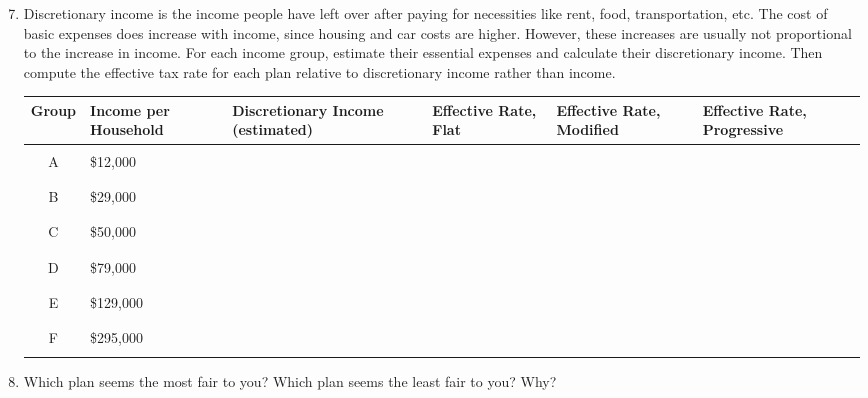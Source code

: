 \begin{exercises}
\begin{minipage}[t]{\textwidth}
\begin{enumerate}[1)]
\setcounter{enumi}{6}
\item Discretionary income is the income people have left over after paying for necessities like rent, food, transportation, etc.  The cost of basic expenses does increase with income, since housing and car costs are higher.  However, these increases are usually not proportional to the increase in income.  For each income group, estimate their essential expenses and calculate their discretionary income.  Then compute the effective tax rate for each plan relative to discretionary income rather than income.
\begin{center}
\begin{tabular}{|c | p{0.75in} | p{1.3in} | p{0.75in} | p{1in} | p{1in} |}
\hline
Group & Income per Household & Discretionary Income (estimated) & Effective Rate, Flat & Effective Rate, Modified & Effective Rate, Progressive\\
\hline
& & & & & \\
A & \$12,000 & & & & \\
& & & & & \\
\hline
& & & & & \\
B & \$29,000 & & & & \\
& & & & & \\
\hline
& & & & & \\
C & \$50,000 & & & & \\
& & & & & \\
\hline
& & & & & \\
D & \$79,000 & & & & \\
& & & & & \\
\hline
& & & & & \\
E & \$129,000 & & & & \\
& & & & & \\
\hline
& & & & & \\
F & \$295,000 & & & & \\
& & & & & \\
\hline
\end{tabular}
\end{center}

\item Which plan seems the most fair to you?  Which plan seems the least fair to you?  Why?
\end{enumerate}
\end{minipage}
\end{exercises}
